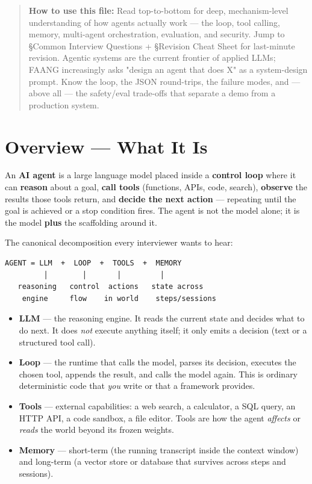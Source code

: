 \documentclass[11pt]{article}
\providecommand{\tightlist}{\setlength{\itemsep}{1pt}\setlength{\parskip}{0pt}}
\begin{document}
\makecoverpage

\thispagestyle{empty}
{\hypersetup{hidelinks}\tableofcontents}
\clearpage

\begin{quote}
\textbf{How to use this file:} Read top-to-bottom for deep, mechanism-level understanding of how agents actually work --- the loop, tool calling, memory, multi-agent orchestration, evaluation, and security. Jump to §Common Interview Questions + §Revision Cheat Sheet for last-minute revision. Agentic systems are the current frontier of applied LLMs; FAANG increasingly asks "design an agent that does X" as a system-design prompt. Know the loop, the JSON round-trips, the failure modes, and --- above all --- the safety/eval trade-offs that separate a demo from a production system.
\end{quote}

\section{Overview --- What It Is}\label{overview--what-it-is}

An \textbf{AI agent} is a large language model placed inside a \textbf{control loop} where it can \textbf{reason} about a goal, \textbf{call tools} (functions, APIs, code, search), \textbf{observe} the results those tools return, and \textbf{decide the next action} --- repeating until the goal is achieved or a stop condition fires. The agent is not the model alone; it is the model \textbf{plus} the scaffolding around it.

The canonical decomposition every interviewer wants to hear:

\setcodelang{}

\begin{verbatim}
AGENT = LLM  +  LOOP  +  TOOLS  +  MEMORY
         │        │       │         │
   reasoning   control  actions   state across
    engine     flow    in world    steps/sessions
\end{verbatim}

\begin{itemize}
\tightlist
\item
  \textbf{LLM} --- the reasoning engine. It reads the current state and decides what to do next. It does \emph{not} execute anything itself; it only emits a decision (text or a structured tool call).
\item
  \textbf{Loop} --- the runtime that calls the model, parses its decision, executes the chosen tool, appends the result, and calls the model again. This is ordinary deterministic code that \emph{you} write or that a framework provides.
\item
  \textbf{Tools} --- external capabilities: a web search, a calculator, a SQL query, an HTTP API, a code sandbox, a file editor. Tools are how the agent \emph{affects} or \emph{reads} the world beyond its frozen weights.
\item
  \textbf{Memory} --- short-term (the running transcript inside the context window) and long-term (a vector store or database that survives across steps and sessions).
\end{itemize}
\end{document}
